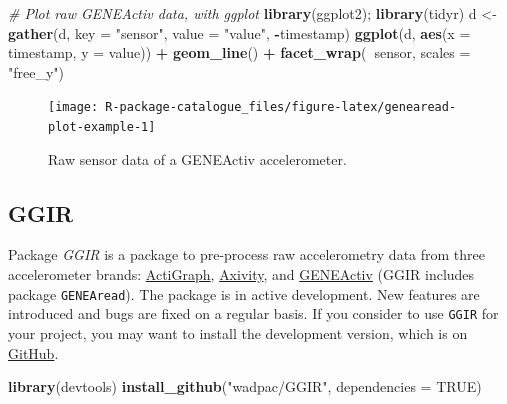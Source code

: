 \documentclass[]{book}
\newenvironment{Shaded}{\begin{snugshade}}{\end{snugshade}}
\newcommand{\KeywordTok}[1]{\textcolor[rgb]{0.13,0.29,0.53}{\textbf{#1}}}
\newcommand{\DataTypeTok}[1]{\textcolor[rgb]{0.13,0.29,0.53}{#1}}
\newcommand{\StringTok}[1]{\textcolor[rgb]{0.31,0.60,0.02}{#1}}
\newcommand{\CommentTok}[1]{\textcolor[rgb]{0.56,0.35,0.01}{\textit{#1}}}
\newcommand{\OtherTok}[1]{\textcolor[rgb]{0.56,0.35,0.01}{#1}}
\newcommand{\OperatorTok}[1]{\textcolor[rgb]{0.81,0.36,0.00}{\textbf{#1}}}
\newcommand{\NormalTok}[1]{#1}
\begin{document}
\begin{Shaded}
\begin{Highlighting}[]
\CommentTok{# Plot raw GENEActiv data, with ggplot}
\KeywordTok{library}\NormalTok{(ggplot2); }\KeywordTok{library}\NormalTok{(tidyr)}
\NormalTok{d <-}\StringTok{ }\KeywordTok{gather}\NormalTok{(d, }\DataTypeTok{key =} \StringTok{"sensor"}\NormalTok{, }\DataTypeTok{value =} \StringTok{"value"}\NormalTok{, }\OperatorTok{-}\NormalTok{timestamp)}
\KeywordTok{ggplot}\NormalTok{(d, }\KeywordTok{aes}\NormalTok{(}\DataTypeTok{x =}\NormalTok{ timestamp, }\DataTypeTok{y =}\NormalTok{ value)) }\OperatorTok{+}\StringTok{ }
\StringTok{  }\KeywordTok{geom_line}\NormalTok{() }\OperatorTok{+}\StringTok{ }
\StringTok{  }\KeywordTok{facet_wrap}\NormalTok{(}\OperatorTok{~}\NormalTok{sensor, }\DataTypeTok{scales =} \StringTok{"free_y"}\NormalTok{)}
\end{Highlighting}
\end{Shaded}

\begin{figure}

{\centering \texttt{[image: R-package-catalogue\_files/figure-latex/genearead-plot-example-1]} 

}

\caption{Raw sensor data of a GENEActiv accelerometer.}\label{fig:genearead-plot-example}
\end{figure}

\subsection{GGIR}\label{ggir}


Package \emph{GGIR} \citep{R-GGIR} is a package to pre-process raw
accelerometry data from three accelerometer brands:
\href{http://actigraphcorp.com/}{ActiGraph},
\href{http://axivity.com/}{Axivity}, and
\href{https://www.geneactiv.org/}{GENEActiv} (GGIR includes package
\texttt{GENEAread}). The package is in active development. New features
are introduced and bugs are fixed on a regular basis. If you consider to
use \texttt{GGIR} for your project, you may want to install the
development version, which is on
\href{https://github.com/wadpac/GGIR}{GitHub}.

\begin{Shaded}
\begin{Highlighting}[]
\KeywordTok{library}\NormalTok{(devtools)}
\KeywordTok{install_github}\NormalTok{(}\StringTok{"wadpac/GGIR"}\NormalTok{, }\DataTypeTok{dependencies =} \OtherTok{TRUE}\NormalTok{)}
\end{Highlighting}
\end{Shaded}
\end{document}
